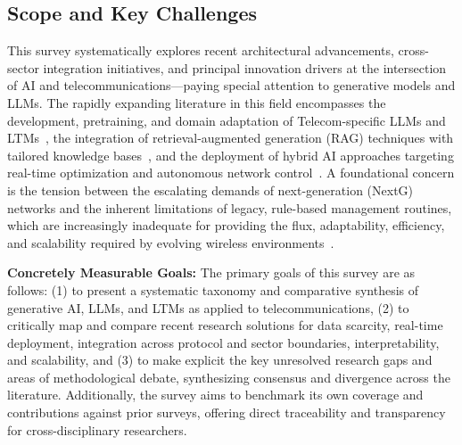 \documentclass[sigconf]{acmart}
\begin{document}
\subsection{Scope and Key Challenges}

This survey systematically explores recent architectural advancements, cross-sector integration initiatives, and principal innovation drivers at the intersection of AI and telecommunications—paying special attention to generative models and LLMs. The rapidly expanding literature in this field encompasses the development, pretraining, and domain adaptation of Telecom-specific LLMs and LTMs~\cite{ref21, ref26, ref33}, the integration of retrieval-augmented generation (RAG) techniques with tailored knowledge bases~\cite{ref16, ref20, ref22, ref34}, and the deployment of hybrid AI approaches targeting real-time optimization and autonomous network control~\cite{ref19, ref49}. A foundational concern is the tension between the escalating demands of next-generation (NextG) networks and the inherent limitations of legacy, rule-based management routines, which are increasingly inadequate for providing the flux, adaptability, efficiency, and scalability required by evolving wireless environments~\cite{ref46, ref49}.

\textbf{Concretely Measurable Goals:} The primary goals of this survey are as follows: (1) to present a systematic taxonomy and comparative synthesis of generative AI, LLMs, and LTMs as applied to telecommunications, (2) to critically map and compare recent research solutions for data scarcity, real-time deployment, integration across protocol and sector boundaries, interpretability, and scalability, and (3) to make explicit the key unresolved research gaps and areas of methodological debate, synthesizing consensus and divergence across the literature. Additionally, the survey aims to benchmark its own coverage and contributions against prior surveys, offering direct traceability and transparency for cross-disciplinary researchers.
\end{document}
